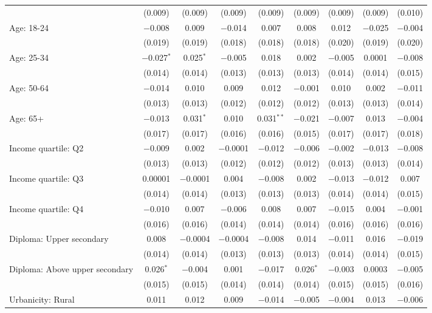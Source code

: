 \begin{tabular}{@{\extracolsep{5pt}}lcccccccc}
  & (0.009) & (0.009) & (0.009) & (0.009) & (0.009) & (0.009) & (0.009) & (0.010) \\ 
  Age: 18\mbox{-}24 & $-$0.008 & 0.009 & $-$0.014 & 0.007 & 0.008 & 0.012 & $-$0.025 & $-$0.004 \\ 
  & (0.019) & (0.019) & (0.018) & (0.018) & (0.018) & (0.020) & (0.019) & (0.020) \\ 
  Age: 25\mbox{-}34 & $-$0.027$^{*}$ & 0.025$^{*}$ & $-$0.005 & 0.018 & 0.002 & $-$0.005 & 0.0001 & $-$0.008 \\ 
  & (0.014) & (0.014) & (0.013) & (0.013) & (0.013) & (0.014) & (0.014) & (0.015) \\ 
  Age: 50\mbox{-}64 & $-$0.014 & 0.010 & 0.009 & 0.012 & $-$0.001 & 0.010 & 0.002 & $-$0.011 \\ 
  & (0.013) & (0.013) & (0.012) & (0.012) & (0.012) & (0.013) & (0.013) & (0.014) \\ 
  Age: 65+ & $-$0.013 & 0.031$^{*}$ & 0.010 & 0.031$^{**}$ & $-$0.021 & $-$0.007 & 0.013 & $-$0.004 \\ 
  & (0.017) & (0.017) & (0.016) & (0.016) & (0.015) & (0.017) & (0.017) & (0.018) \\ 
  Income quartile: Q2 & $-$0.009 & 0.002 & $-$0.0001 & $-$0.012 & $-$0.006 & $-$0.002 & $-$0.013 & $-$0.008 \\ 
  & (0.013) & (0.013) & (0.012) & (0.012) & (0.012) & (0.013) & (0.013) & (0.014) \\ 
  Income quartile: Q3 & 0.00001 & $-$0.0001 & 0.004 & $-$0.008 & 0.002 & $-$0.013 & $-$0.012 & 0.007 \\ 
  & (0.014) & (0.014) & (0.013) & (0.013) & (0.013) & (0.014) & (0.014) & (0.015) \\ 
  Income quartile: Q4 & $-$0.010 & 0.007 & $-$0.006 & 0.008 & 0.007 & $-$0.015 & 0.004 & $-$0.001 \\ 
  & (0.016) & (0.016) & (0.014) & (0.014) & (0.014) & (0.016) & (0.016) & (0.016) \\ 
  Diploma: Upper secondary & 0.008 & $-$0.0004 & $-$0.0004 & $-$0.008 & 0.014 & $-$0.011 & 0.016 & $-$0.019 \\ 
  & (0.014) & (0.014) & (0.013) & (0.013) & (0.013) & (0.014) & (0.014) & (0.015) \\ 
  Diploma: Above upper secondary & 0.026$^{*}$ & $-$0.004 & 0.001 & $-$0.017 & 0.026$^{*}$ & $-$0.003 & 0.0003 & $-$0.005 \\ 
  & (0.015) & (0.015) & (0.014) & (0.014) & (0.014) & (0.015) & (0.015) & (0.016) \\ 
  Urbanicity: Rural & 0.011 & 0.012 & 0.009 & $-$0.014 & $-$0.005 & $-$0.004 & 0.013 & $-$0.006 \\ 

\end{tabular}
